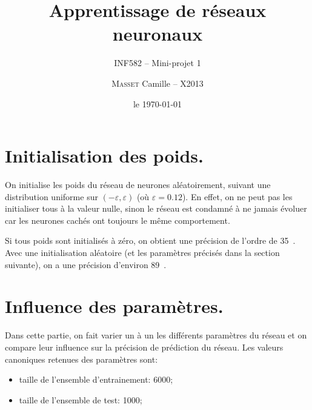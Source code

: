 \documentclass[a4paper, 12pt]{article}
\title{Apprentissage de réseaux neuronaux}
\subtitle{INF582 -- Mini-projet 1}
\author{\textsc{Masset} Camille -- X2013}
\date{le \today}
\begin{document}
\renewcommand{\arraystretch}{1.5}

\maketitle

\section{Initialisation des poids.}
On initialise les poids du réseau de neurones aléatoirement, suivant une distribution uniforme sur $(-\varepsilon, \varepsilon)$ (où $\varepsilon = \num{0.12}$).
En effet, on ne peut pas les initialiser tous à la valeur nulle, sinon le réseau est condamné à ne jamais évoluer car les neurones cachés ont toujours le même comportement.

Si tous poids sont initialisés à zéro, on obtient une précision de l'ordre de 35~\percent{}.
Avec une initialisation aléatoire (et les paramètres précisés dans la section suivante), on a une précision d'environ 89~\percent{}.

\section{Influence des paramètres.}
Dans cette partie, on fait varier un à un les différents paramètres du réseau et on compare leur influence sur la précision de prédiction du réseau.
Les valeurs \og{}canoniques\fg{} retenues des paramètres sont:
\begin{itemize}
    \item taille de l'ensemble d'entrainement: \num{6000};
    \item taille de l'ensemble de test: \num{1000};
    \item nombre de couches cachées: \num{1};
    \item nombre de neurones par couche cachée: \num{15};
    \item nombre d'itérations lors de la phase d'apprentissage: \num{50};
    \item paramètre de régularisation: $\lambda = \num{3}$.
\end{itemize}
À chaque fois, on effectue quatre exécutions de l'apprentissage et du test pour obtenir une précision moyenne.

Pour ces paramètres, on obtient une précision moyenne de \num{90.7}.
\end{document}
